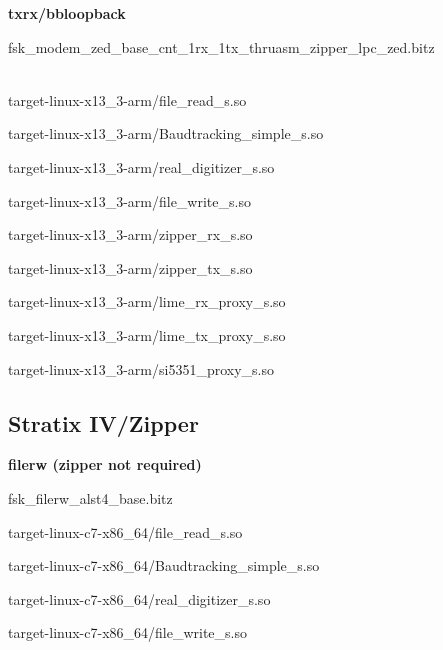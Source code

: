 	\noindent\textbf{txrx/bbloopback}
	\begin{itemize}
	\item fsk\_modem\_zed\_base\_cnt\_1rx\_1tx\_thruasm\_zipper\_lpc\_zed.bitz \\ \\
	\begin{minipage}[t]{.5\textwidth}
	\item target-linux-x13\_3-arm/file\_read\_s.so
	\item target-linux-x13\_3-arm/Baudtracking\_simple\_s.so
	\item target-linux-x13\_3-arm/real\_digitizer\_s.so
	\item target-linux-x13\_3-arm/file\_write\_s.so
	\end{minipage}
	\begin{minipage}[t]{.5\textwidth}
	\item target-linux-x13\_3-arm/zipper\_rx\_s.so
	\item target-linux-x13\_3-arm/zipper\_tx\_s.so
	\item target-linux-x13\_3-arm/lime\_rx\_proxy\_s.so
	\item target-linux-x13\_3-arm/lime\_tx\_proxy\_s.so
	\item target-linux-x13\_3-arm/si5351\_proxy\_s.so
	\end{minipage}
	\end{itemize}
\subsection{Stratix IV/Zipper}
	\noindent\textbf{filerw (zipper not required)}
	\begin{itemize}
	\begin{minipage}[t]{.5\textwidth}
	\item fsk\_filerw\_alst4\_base.bitz
	\item target-linux-c7-x86\_64/file\_read\_s.so
	\item target-linux-c7-x86\_64/Baudtracking\_simple\_s.so
	\end{minipage}
	\begin{minipage}[t]{.5\textwidth}
	\item target-linux-c7-x86\_64/real\_digitizer\_s.so
	\item target-linux-c7-x86\_64/file\_write\_s.so
	\end{minipage}
	\end{itemize}

